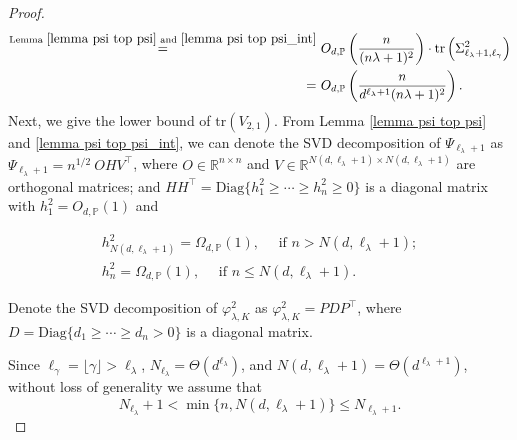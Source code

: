 \documentclass{article}
\theoremstyle{plain}
\theoremstyle{definition}
\theoremstyle{remark}
\begin{document}
\begin{appendix}
\begin{proof}
\begin{equation*}
\begin{aligned}
        \overset{\text{Lemma } \ref{lemma psi top psi} \text{ and } \ref{lemma psi top psi_int}}{=}&~
        O_{d, \mathbb{P}}\left(\frac{n}{(n\lambda+1)^2}\right) \cdot \mathrm{tr} \left( \Sigma_{\ell_{\lambda}+1, \ell_{\gamma}}^{2} \right)\\
        =&~
        O_{d, \mathbb{P}}\left(\frac{n}{d^{\ell_{\lambda}+1}(n\lambda+1)^2}\right).
    \end{aligned}
\end{equation*}
Next, we give the lower bound of $\mathrm{tr}(V_{2, 1})$.
From Lemma \ref{lemma psi top psi} and \ref{lemma psi top psi_int}, we can denote the SVD decomposition of $ \Psi_{\ell_{\lambda}+1} $ as $ \Psi_{\ell_{\lambda}+1} = n^{1/2} ~ O H V^{\top} $, where $ O \in \mathbb{R}^{n \times n}$ and $ V \in \mathbb{R}^{N(d, \ell_{\lambda}+1) \times N(d, \ell_{\lambda}+1)}$ are orthogonal matrices; and $HH^{\top}=\text{Diag}\{h_1^2 \geq \cdots \geq h_n^2 \geq 0\}$ is a diagonal matrix with $h_1^2=O_{d, \mathbb{P}}(1)$ and 

\begin{equation}\label{eqn_lower_bound_h_in_variance}
    \begin{aligned}
        h_{N(d, \ell_{\lambda}+1)}^2=\Omega_{d, \mathbb{P}}(1), \quad \text{ if } n > N(d, \ell_{\lambda}+1);\\
        h_{n}^2=\Omega_{d, \mathbb{P}}(1), \quad \text{ if } n \leq N(d, \ell_{\lambda}+1).
    \end{aligned}
\end{equation}

Denote the SVD decomposition of $\varphi_{\lambda, K}^2$ as $\varphi_{\lambda, K}^2=PDP^{\top}$, where $D=\text{Diag}\{d_1 \geq \cdots \geq d_n > 0\}$ is a diagonal matrix. 

Since $\ell_{\gamma} = \lfloor \gamma \rfloor > \ell_{\lambda}$, $N_{\ell_{\lambda}} = \Theta(d^{\ell_{\lambda}})$, and $N(d, \ell_{\lambda}+1)= \Theta(d^{\ell_{\lambda}+1})$, without loss of generality we assume that
$$
N_{\ell_{\lambda}} + 1 < \min\{n, N(d, \ell_{\lambda}+1)\} \leq N_{\ell_{\lambda}+1}.
$$


\end{proof}
\end{appendix}
\end{document}
